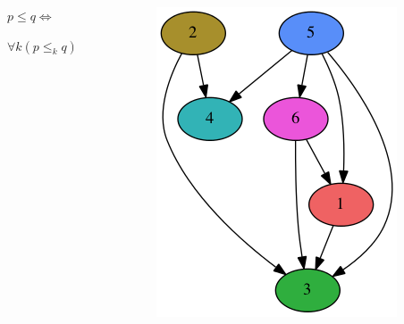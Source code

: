 \documentclass{beamer}
\begin{document}
\begin{frame}
\begin{columns}
\begin{column}{.5\textwidth}
            $p \leq q \iff $
            
            $\forall k (p \leq_k q)$
        \end{column}
        \begin{column}{.5\textwidth}
            \includegraphics[width=\textwidth]{images/graph/graph.png}
        \end{column}
    \end{columns}
\end{frame}
\end{document}
